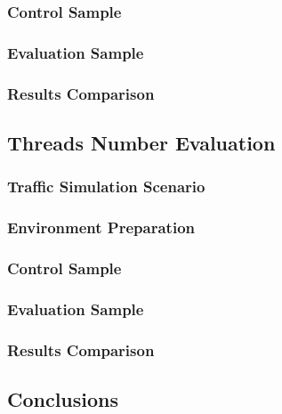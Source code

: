 \documentclass[10pt,a4paper]{article}
\begin{document}
\subsubsection{Control Sample} 
\subsubsection{Evaluation Sample} 
\subsubsection{Results Comparison} 

\subsection{Threads Number Evaluation}
\subsubsection{Traffic Simulation Scenario} 
\subsubsection{Environment Preparation} 
\subsubsection{Control Sample} 
\subsubsection{Evaluation Sample} 
\subsubsection{Results Comparison} 

\subsection{Conclusions} 

\pagebreak
\clearpage
\end{document}
